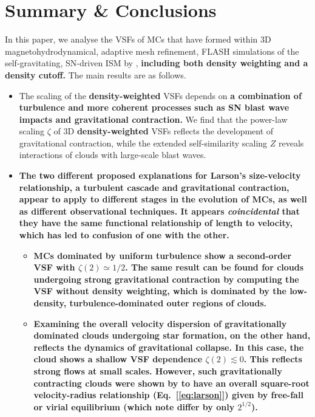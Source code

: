 \section{Summary \& Conclusions}\label{conclusions}

In this paper, we analyse the VSFs of MCs that have formed within 3D magnetohydrodynamical, adaptive mesh refinement, FLASH simulations of the self-gravitating, SN-driven ISM by , \textbf{including both density weighting and a density cutoff.}
The main results are as follows.

\begin{itemize}
	\item The scaling of the \textbf{density-weighted} VSFs depends on \textbf{a combination of turbulence and more coherent processes such as SN blast wave impacts and gravitational contraction.}
    We find that the power-law scaling $\zeta$ of 3D \textbf{density-weighted} VSFs reflects the development of gravitational contraction, while the extended self-similarity scaling $Z$ reveals interactions of clouds with large-scale blast waves.
    \item \textbf{
    The two different proposed explanations for Larson's size-velocity relationship, a turbulent cascade and gravitational contraction,  appear to apply to different stages in the evolution of MCs, as well as different observational techniques. It appears {\em coincidental} that they have the same functional relationship of length to velocity, which has led to confusion of one with the other.
    }
    \begin{itemize}
        \item \textbf{
        MCs dominated by uniform turbulence show a second-order VSF with $\zeta(2) \simeq 1/2$.  The same result can be found for clouds undergoing strong gravitational contraction by computing the VSF without density weighting, which is dominated by the low-density, turbulence-dominated outer regions of clouds.
        }
    \item \textbf{
        Examining the overall velocity dispersion of gravitationally dominated clouds undergoing star formation, on the other hand, reflects the dynamics of gravitational collapse.  In this case, the cloud shows a shallow VSF dependence $\zeta(2) \lesssim 0$. This reflects strong flows at small scales. However, such gravitationally contracting clouds were shown by  to have an overall square-root velocity-radius relationship (Eq.~[\ref{eq:larson}]) given by free-fall or virial equilibrium (which \citealt{Ballesteros2011} note differ by only $2^{1/2}$).
}
\end{itemize}
\end{itemize}
